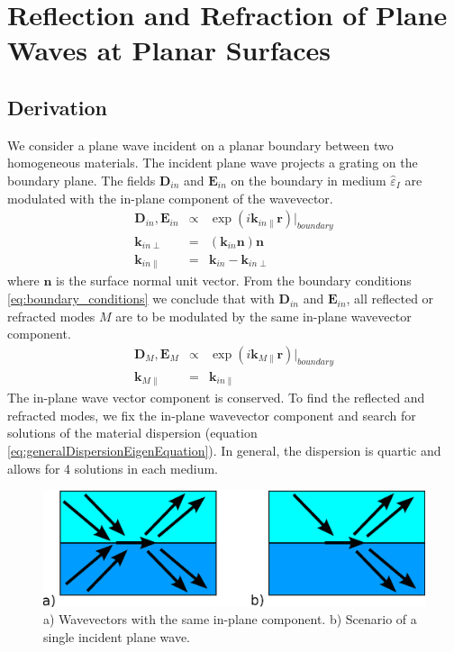 \documentclass[12pt,a4paper,twoside,openright,BCOR10mm,headsepline,titlepage,abstracton,chapterprefix,final]{scrreprt}
\newcommand\Vector[1]{{\mathbf{#1}}}
\newcommand\Location{\Vector{r}}
\newcommand\wavenumber{k}
\newcommand\Wavevector{\Vector{\wavenumber}}
\newcommand\Tensor[1]{\hat{#1}}
\newcommand\scalarEfield{E}
\newcommand\scalarDfield{D}
\newcommand\Efield{\Vector{\scalarEfield}}
\newcommand\Dfield{\Vector{\scalarDfield}}
\newcommand\permittivity{\Tensor{\scalarpermittivity}}
\newcommand\scalarpermittivity{\varepsilon}
\newcommand\materialone{I}
\begin{document}
\section{Reflection and Refraction of Plane Waves at Planar Surfaces}

\subsection{Derivation}
We consider a plane wave incident on a planar boundary between two homogeneous materials.
The incident plane wave projects a grating on the boundary plane. 
The fields $\Dfield_{in}$ and $\Efield_{in}$ on the boundary in medium $\permittivity_\materialone$ are modulated with the in-plane component of the wavevector. 
\begin{eqnarray}
 \Dfield_{in}, \Efield_{in} &\propto& \exp( i \Wavevector_{in\parallel} \Location)|_{boundary} \\
 \Wavevector_{in\perp} &=& ( \Wavevector_{in} \Vector{n} ) \Vector{n} \\
 \Wavevector_{in\parallel} &=& \Wavevector_{in} - \Wavevector_{in\perp}
\end{eqnarray}
where $\Vector{n}$ is the surface normal unit vector.
From the boundary conditions \ref{eq:boundary_conditions} we conclude that with $\Dfield_{in}$ and $\Efield_{in}$, 
all reflected or refracted modes $M$ are to be modulated by the same in-plane wavevector component.
\begin{eqnarray}
  \Dfield_{M}, \Efield_{M} &\propto& \exp( i \Wavevector_{M\parallel} \Location)|_{boundary} \\
  \Wavevector_{M\parallel} &=& \Wavevector_{in\parallel}
\end{eqnarray}
The in-plane wave vector component is conserved.
To find the reflected and refracted modes, 
we fix the in-plane wavevector component and search for solutions of the material dispersion
(equation \ref{eq:generalDispersionEigenEquation}).
In general, the dispersion is quartic and allows for 4 solutions in each medium.
\begin{figure}
  \centering
   \includegraphics[width=0.5\columnwidth]{boundary_wavevectors}
  \caption{a) Wavevectors with the same in-plane component.
           b) Scenario of a single incident plane wave.}
  \label{fig:boundary_wavevectors}
\end{figure}
\end{document}
